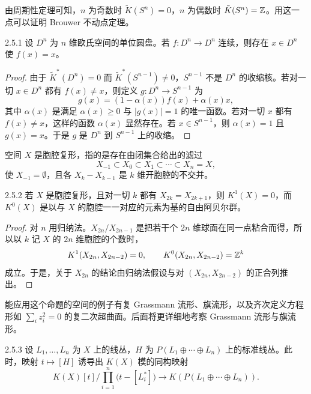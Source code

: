 由周期性定理可知，$n$ 为奇数时 $\tilde K(S^n)=0$，$n$ 为偶数时 $\tilde K(S^n)=\mathbb{Z}$。用这一点可以证明 Brouwer 不动点定理。

\begin{theorem*}{2.5.1}
  设 $D^n$ 为 $n$ 维欧氏空间的单位圆盘。若 $f\colon D^n\to D^n$ 连续，则存在 $x\in D^n$ 使 $f(x)=x$。
\end{theorem*}

\begin{proof}
  由于 $\tilde K^*(D^n)=0$ 而 $\tilde K^*(S^{n-1})\ne0$，$S^{n-1}$ 不是 $D^n$ 的收缩核。若对一切 $x\in D^n$ 都有 $f(x)\ne x$，则定义 $g\colon D^n\to S^{n-1}$ 为
  \[
  g(x)=(1-\alpha(x))f(x)+\alpha(x)x,
  \]
  其中 $\alpha(x)$ 是满足 $\alpha(x)\ge0$ 与 $|g(x)|=1$ 的唯一函数。若对一切 $x$ 都有 $f(x)\ne x$，这样的函数 $\alpha(x)$ 显然存在。若 $x\in S^{n-1}$，则 $\alpha(x)=1$ 且 $g(x)=x$。于是 $g$ 是 $D^n$ 到 $S^{n-1}$ 上的收缩。
\end{proof}


空间 $X$ 是胞腔复形，指的是存在由闭集合给出的滤过
\[
X_{-1}\subset X_0\subset X_1\subset\cdots\subset X_n=X,
\]
使 $X_{-1}=\emptyset$，且各 $X_k-X_{k-1}$ 是 $k$ 维开胞腔的不交并。

\begin{proposition*}{2.5.2}
  若 $X$ 是胞腔复形，且对一切 $k$ 都有 $X_{2k}=X_{2k+1}$，则 $K^1(X)=0$，而 $K^0(X)$ 是以与 $X$ 的胞腔一一对应的元素为基的自由阿贝尔群。
\end{proposition*}

\begin{proof}
  对 $n$ 用归纳法。$X_{2n}/X_{2n-1}$ 是把若干个 $2n$ 维球面在同一点粘合而得，所以以 $k$ 记 $X$ 的 $2n$ 维胞腔的个数时，
  \[
  K^1(X_{2n},X_{2n-2})=0,\qquad K^0(X_{2n},X_{2n-2})=\mathbb{Z}^k
  \]
  成立。于是，关于 $X_{2n}$ 的结论由归纳法假设与对 $(X_{2n},X_{2n-2})$ 的正合列推出。
\end{proof}


能应用这个命题的空间的例子有复 Grassmann 流形、旗流形，以及齐次定义方程形如 $\sum_i z_i^2=0$ 的复二次超曲面。后面将更详细地考察 Grassmann 流形与旗流形。

\begin{proposition*}{2.5.3}
  设 $L_1,\ldots,L_n$ 为 $X$ 上的线丛，$H$ 为 $P(L_1\oplus\cdots\oplus L_n)$ 上的标准线丛。此时，映射 $t\mapsto[H]$ 诱导出 $K(X)$ 模的同构映射
  \[
  K(X)[t]\Big/\prod_{i=1}^{n}\bigl(t-[L_i^*]\bigr)
  \longrightarrow K(P(L_1\oplus\cdots\oplus L_n)).
  \]
\end{proposition*}

